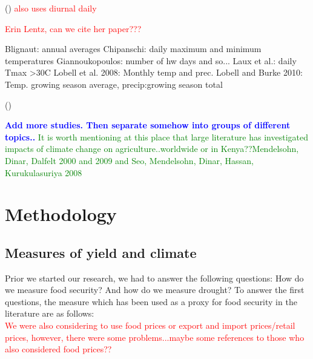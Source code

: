 \documentclass[a4paper,12pt]{article}
\begin{document}
(\citealt{ThorntonEtAl2009}) \textcolor{red}{also uses diurnal daily}

\textcolor{red}{Erin Lentz, can we cite her paper???}


Blignaut: annual averages
Chipanschi: daily maximum and minimum temperatures
Giannoukopoulos: number of hw days and so...
Laux et al.: daily Tmax >30C
Lobell et al. 2008: Monthly temp and prec.
Lobell and Burke 2010: Temp. growing season average, precip:growing season total

(\citealt{AbrahaSavage2006,Adejuwon2004,BenMohamed2002,BLIGNAUT2009,
Chipanshi2003,Giannakopoulos2009,LauxEtAl,Leemans1993,LobellEtAl2008,
LobellBurke2010,sagoe2006,SchulzeEtA1993,ThorntonEtAl2009,TingemEtAl2008,
TingemEtAl2009,WalkerSchulze2008})

\textcolor{blue}{\textbf{Add more studies. Then separate somehow into groups of different topics..}}
\textcolor{green}{It is worth mentioning at this place that large literature has investigated impacts of climate change on agriculture..worldwide or in Kenya??Mendelsohn, Dinar, Dalfelt 2000 and 2009 and Seo, Mendelsohn, Dinar, Hassan, Kurukulasuriya 2008
}

\section{Methodology}\label{Method}

\subsection{Measures of yield and climate}

 
Prior we started  our research, we had to answer the following questions: How do we measure food security? And how do we measure drought? To answer the first questions, the measure which has been used as a proxy for food security in the literature are as follows:\\

\textcolor{red}{We were also considering to use food prices or export and import prices/retail prices, however, there were some problems...maybe some references to those who also considered food prices??}
\vspace{2cm}
\end{document}
